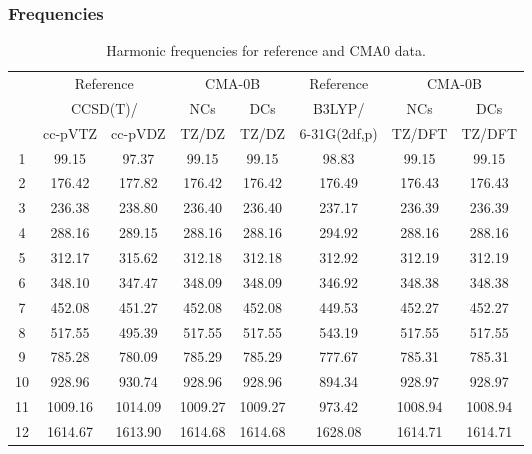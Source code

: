\documentclass[10pt,oneside]{article}
\begin{document}
\subsubsection*{Frequencies}
\begin{table}[h!]
\centering
\caption{Harmonic frequencies for reference and CMA0 data.}
\begin{tabular}{cccccccc}
\toprule
{} & \multicolumn{2}{c}{Reference} & \multicolumn{2}{c}{CMA-0B} &    Reference & \multicolumn{2}{c}{CMA-0B} \\
{} & \multicolumn{2}{c}{CCSD(T)/} &     NCs &     DCs &       B3LYP/ &     NCs &     DCs \\
{} &   cc-pVTZ & cc-pVDZ &   TZ/DZ &   TZ/DZ & 6-31G(2df,p) &  TZ/DFT &  TZ/DFT \\
\midrule
1  &     99.15 &   97.37 &   99.15 &   99.15 &        98.83 &   99.15 &   99.15 \\
2  &    176.42 &  177.82 &  176.42 &  176.42 &       176.49 &  176.43 &  176.43 \\
3  &    236.38 &  238.80 &  236.40 &  236.40 &       237.17 &  236.39 &  236.39 \\
4  &    288.16 &  289.15 &  288.16 &  288.16 &       294.92 &  288.16 &  288.16 \\
5  &    312.17 &  315.62 &  312.18 &  312.18 &       312.92 &  312.19 &  312.19 \\
6  &    348.10 &  347.47 &  348.09 &  348.09 &       346.92 &  348.38 &  348.38 \\
7  &    452.08 &  451.27 &  452.08 &  452.08 &       449.53 &  452.27 &  452.27 \\
8  &    517.55 &  495.39 &  517.55 &  517.55 &       543.19 &  517.55 &  517.55 \\
9  &    785.28 &  780.09 &  785.29 &  785.29 &       777.67 &  785.31 &  785.31 \\
10 &    928.96 &  930.74 &  928.96 &  928.96 &       894.34 &  928.97 &  928.97 \\
11 &   1009.16 & 1014.09 & 1009.27 & 1009.27 &       973.42 & 1008.94 & 1008.94 \\
12 &   1614.67 & 1613.90 & 1614.68 & 1614.68 &      1628.08 & 1614.71 & 1614.71 \\
\bottomrule
\end{tabular}
\end{table}

\clearpage
\end{document}
